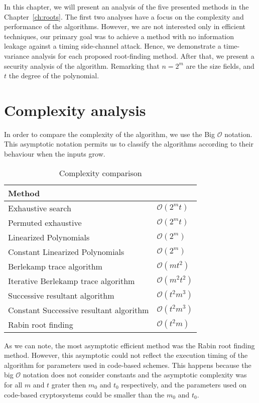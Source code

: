 In this chapter, we will present an analysis of the five presented methods in the Chapter~\ref{ch:roots}. The first two analyses have a focus on the complexity and performance of the algorithms. However, we are not interested only in efficient techniques, our primary goal was to achieve a method with no information leakage against a timing side-channel attack. Hence, we demonstrate a time-variance analysis for each proposed root-finding method. After that, we present a security analysis of the algorithm. Remarking that $n = 2^m$ are the size fields, and $t$ the degree of the polynomial.

\section{Complexity analysis}
In order to compare the complexity of the algorithm, we use the Big $\mathcal{O}$ notation. This asymptotic notation permits us to classify the algorithms according to their behaviour when the inputs grow. 

\begin{table}[ht]
\centering
\label{tab:complexity}
\caption{Complexity comparison}
\begin{tabular}{ll}
Method                                  &                \\ \hline
Exhaustive search                       & $\mathcal{O}(2^mt)$ \\
Permuted exhaustive                     & $\mathcal{O}(2^mt)$ \\
Linearized Polynomials                  & $\mathcal{O}(2^m)$ \\
Constant Linearized Polynomials         & $\mathcal{O}(2^m)$ \\
Berlekamp trace algorithm               & $\mathcal{O}(mt^2)$ \\
Iterative Berlekamp trace algorithm     & $\mathcal{O}(m^2t^2)$ \\
Successive resultant algorithm          & $\mathcal{O}(t^2m^3)$ \\
Constant Successive resultant algorithm & $\mathcal{O}(t^2m^3)$ \\
Rabin root finding                      & $\mathcal{O}(t^2m)$
\end{tabular}
\end{table}

As we can note, the most asymptotic efficient method was the Rabin root finding method. However, this asymptotic could not reflect the execution timing of the algorithm for parameters used in code-based schemes. This happens because the big $\mathcal{O}$ notation does not consider constants and the asymptotic complexity was for all $m$ and $t$ grater then $m_0$ and $t_0$ respectively, and the parameters used on code-based cryptosystems could be smaller than the $m_0$ and $t_0$.

